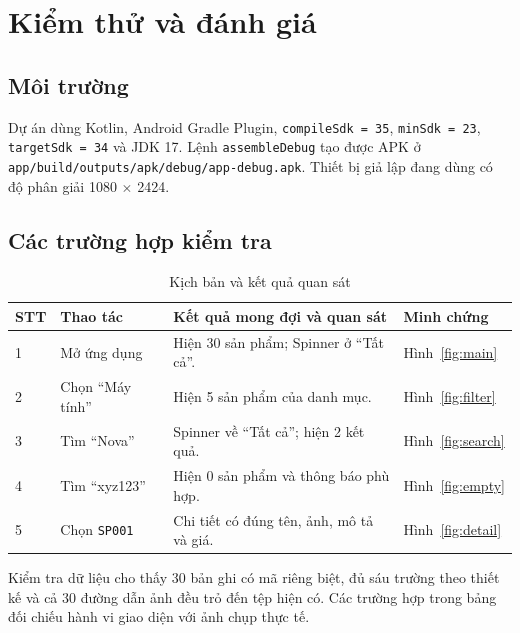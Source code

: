 \documentclass[12pt,a4paper]{article}
\newcommand{\codepath}[1]{\nolinkurl{#1}}
\begin{document}
\section{Kiểm thử và đánh giá}
\subsection{Môi trường}
Dự án dùng Kotlin, Android Gradle Plugin, \texttt{compileSdk = 35},
\texttt{minSdk = 23}, \texttt{targetSdk = 34} và JDK 17.
Lệnh \texttt{assembleDebug} tạo được APK ở
\codepath{app/build/outputs/apk/debug/app-debug.apk}.
Thiết bị giả lập đang dùng có độ phân giải 1080 $\times$ 2424.

\subsection{Các trường hợp kiểm tra}
\begin{table}[H]
\centering
\caption{Kịch bản và kết quả quan sát}
\small
\begin{tabularx}{\textwidth}{@{}p{0.9cm}p{3.9cm}X p{2.7cm}@{}}
\toprule
\textbf{STT} & \textbf{Thao tác} & \textbf{Kết quả mong đợi và quan sát} & \textbf{Minh chứng}\\
\midrule
1 & Mở ứng dụng & Hiện 30 sản phẩm; Spinner ở “Tất cả”. & Hình~\ref{fig:main}\\
2 & Chọn “Máy tính” & Hiện 5 sản phẩm của danh mục. & Hình~\ref{fig:filter}\\
3 & Tìm “Nova” & Spinner về “Tất cả”; hiện 2 kết quả. & Hình~\ref{fig:search}\\
4 & Tìm “xyz123” & Hiện 0 sản phẩm và thông báo phù hợp. & Hình~\ref{fig:empty}\\
5 & Chọn \texttt{SP001} & Chi tiết có đúng tên, ảnh, mô tả và giá. & Hình~\ref{fig:detail}\\
\bottomrule
\end{tabularx}
\end{table}
\noindent Kiểm tra dữ liệu cho thấy 30 bản ghi có mã riêng biệt, đủ sáu trường
theo thiết kế và cả 30 đường dẫn ảnh đều trỏ đến tệp hiện có.
Các trường hợp trong bảng đối chiếu hành vi giao diện với ảnh chụp thực tế.
\end{document}
